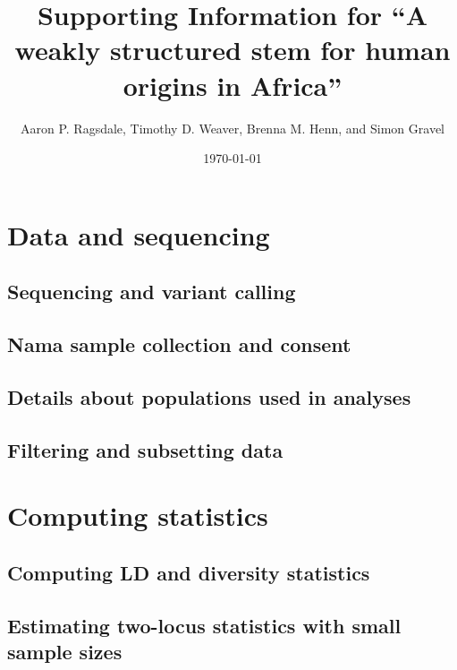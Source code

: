 \documentclass[]{article}
\begin{document}
\title{Supporting Information for ``A weakly structured stem for human origins in Africa''}
\author{Aaron P. Ragsdale, Timothy D. Weaver, Brenna M. Henn, and Simon Gravel}
\date{\today}
\maketitle

\renewcommand{\thefigure}{S\arabic{figure}}
\renewcommand{\thetable}{S\arabic{table}}
\renewcommand{\theequation}{S\arabic{equation}}
\setcounter{figure}{0}
\setcounter{table}{0}
\setcounter{equation}{0}

\tableofcontents
\newpage

\section{Data and sequencing}

\subsection{Sequencing and variant calling}
\cite{Kelleher2016-lw}

\subsection{Nama sample collection and consent}

\subsection{Details about populations used in analyses}

\subsection{Filtering and subsetting data}

\section{Computing statistics}

\subsection{Computing LD and diversity statistics}

\subsection{Estimating two-locus statistics with small sample sizes}
\end{document}
